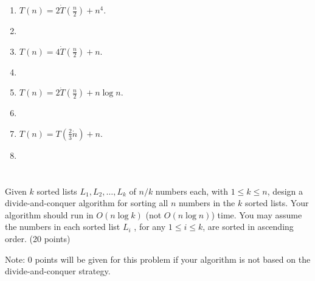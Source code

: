 \documentclass{article}
\begin{document}
 \begin{enumerate}[label=(\alph*)]
 \item $T(n) = 2\dot T\left(\frac{n}{2}\right) + n^4$.
 \item[]
 \item $T(n) = 4\dot T\left(\frac{n}{2}\right) + n$.
 \item[]
 \item $T(n) = 2\dot T\left(\frac{n}{2}\right) + n\log n$.
 \item[]
 \item $T(n) = T\left(\frac{2}{3}\dot n\right) + n$.
 \item[]
 \end{enumerate}


\section{}
 Given $k$ sorted lists $L_1 ,L_2 ,\dots ,L_k$ of $n/k$ numbers each,
 with $1 \le k \le n$, design a divide-and-conquer algorithm for
 sorting all $n$ numbers in the $k$ sorted lists. Your algorithm
 should run in $O(n\log k)$ (not $O(n\log n)$) time. You may assume
 the numbers in each sorted list $L_i$ , for any $1 \le i \le k$, are
 sorted in ascending order. (20 points) 

Note: 0 points will be given for this problem if your algorithm is not
based on the divide-and-conquer strategy. 
\end{document}
